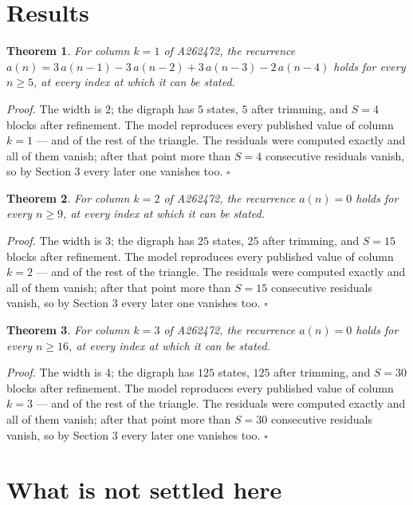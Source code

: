 \documentclass[11pt]{article}
\newtheorem{theorem}{Theorem}
\theoremstyle{definition}
\begin{document}
\section{Results}

\begin{theorem} For column $k = 1$ of A262472, the recurrence $a(n) = 3\,a(n-1) - 3\,a(n-2) + 3\,a(n-3) - 2\,a(n-4)$ holds for every $n \ge 5$, at every index at which it can be stated.\end{theorem}

{\itshape Proof.} The width is $2$; the digraph has $5$ states, $5$ after trimming, and $S = 4$ blocks after refinement. The model reproduces every published value of column $k = 1$ --- and of the rest of the triangle. The residuals were computed exactly and all of them vanish; after that point more than $S = 4$ consecutive residuals vanish, so by Section 3 every later one vanishes too. $\square$

\begin{theorem} For column $k = 2$ of A262472, the recurrence $a(n) = 0$ holds for every $n \ge 9$, at every index at which it can be stated.\end{theorem}

{\itshape Proof.} The width is $3$; the digraph has $25$ states, $25$ after trimming, and $S = 15$ blocks after refinement. The model reproduces every published value of column $k = 2$ --- and of the rest of the triangle. The residuals were computed exactly and all of them vanish; after that point more than $S = 15$ consecutive residuals vanish, so by Section 3 every later one vanishes too. $\square$

\begin{theorem} For column $k = 3$ of A262472, the recurrence $a(n) = 0$ holds for every $n \ge 16$, at every index at which it can be stated.\end{theorem}

{\itshape Proof.} The width is $4$; the digraph has $125$ states, $125$ after trimming, and $S = 30$ blocks after refinement. The model reproduces every published value of column $k = 3$ --- and of the rest of the triangle. The residuals were computed exactly and all of them vanish; after that point more than $S = 30$ consecutive residuals vanish, so by Section 3 every later one vanishes too. $\square$

\section{What is not settled here}
\end{document}
